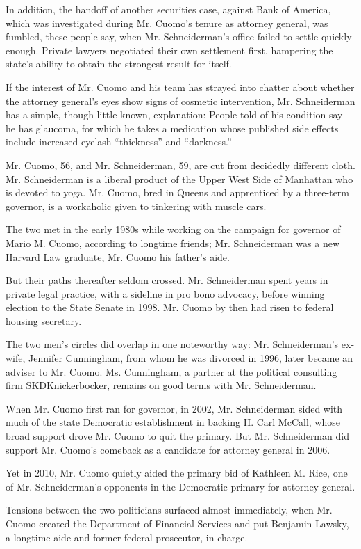 In addition, the handoff of another securities case, against Bank of
America, which was investigated during Mr. Cuomo's tenure as attorney
general, was fumbled, these people say, when Mr. Schneiderman's office
failed to settle quickly enough. Private lawyers negotiated their own
settlement first, hampering the state's ability to obtain the strongest
result for itself.

If the interest of Mr. Cuomo and his team has strayed into chatter about
whether the attorney general's eyes show signs of cosmetic intervention,
Mr. Schneiderman has a simple, though little-known, explanation: People
told of his condition say he has glaucoma, for which he takes a
medication whose published side effects include increased eyelash
``thickness'' and ``darkness.''

Mr. Cuomo, 56, and Mr. Schneiderman, 59, are cut from decidedly
different cloth. Mr. Schneiderman is a liberal product of the Upper West
Side of Manhattan who is devoted to yoga. Mr. Cuomo, bred in Queens and
apprenticed by a three-term governor, is a workaholic given to tinkering
with muscle cars.

The two met in the early 1980s while working on the campaign for
governor of Mario M. Cuomo, according to longtime friends; Mr.
Schneiderman was a new Harvard Law graduate, Mr. Cuomo his father's
aide.

But their paths thereafter seldom crossed. Mr. Schneiderman spent years
in private legal practice, with a sideline in pro bono advocacy, before
winning election to the State Senate in 1998. Mr. Cuomo by then had
risen to federal housing secretary.

The two men's circles did overlap in one noteworthy way: Mr.
Schneiderman's ex-wife, Jennifer Cunningham, from whom he was divorced
in 1996, later became an adviser to Mr. Cuomo. Ms. Cunningham, a partner
at the political consulting firm SKDKnickerbocker, remains on good terms
with Mr. Schneiderman.

When Mr. Cuomo first ran for governor, in 2002, Mr. Schneiderman sided
with much of the state Democratic establishment in backing H. Carl
McCall, whose broad support drove Mr. Cuomo to quit the primary. But Mr.
Schneiderman did support Mr. Cuomo's comeback as a candidate for
attorney general in 2006.

Yet in 2010, Mr. Cuomo quietly aided the primary bid of Kathleen M.
Rice, one of Mr. Schneiderman's opponents in the Democratic primary for
attorney general.

Tensions between the two politicians surfaced almost immediately, when
Mr. Cuomo created the Department of Financial Services and put Benjamin
Lawsky, a longtime aide and former federal prosecutor, in charge.

